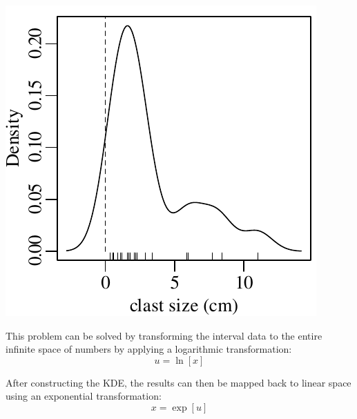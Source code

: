 \noindent\begin{minipage}[t][][b]{.3\textwidth}
  \includegraphics[width=\textwidth]{../figures/negativeKDE.pdf}\medskip
\end{minipage}
\begin{minipage}[t][][t]{.7\textwidth}
  \label{fig:negativeKDE}
\end{minipage}

This problem can be solved by transforming the interval data to the
entire infinite space of numbers by applying a logarithmic
transformation:
\begin{equation}
  u = \ln[x]
\end{equation}

After constructing the KDE, the results can then be mapped back to
linear space using an exponential transformation:
\begin{equation}
  x = \exp[u]
\end{equation}

